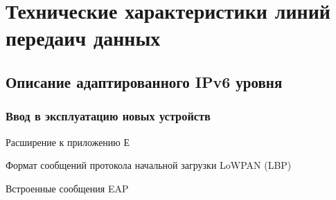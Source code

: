 \section{Технические характеристики линий передаич данных} %

\subsection{Описание адаптированного IPv6 уровня} %
 
\subsubsection{Ввод в эксплуатацию новых устройств} %

Расширение к приложению Е %

Формат сообщений протокола начальной загрузки LoWPAN (LBP) %

Встроенные сообщения EAP %
